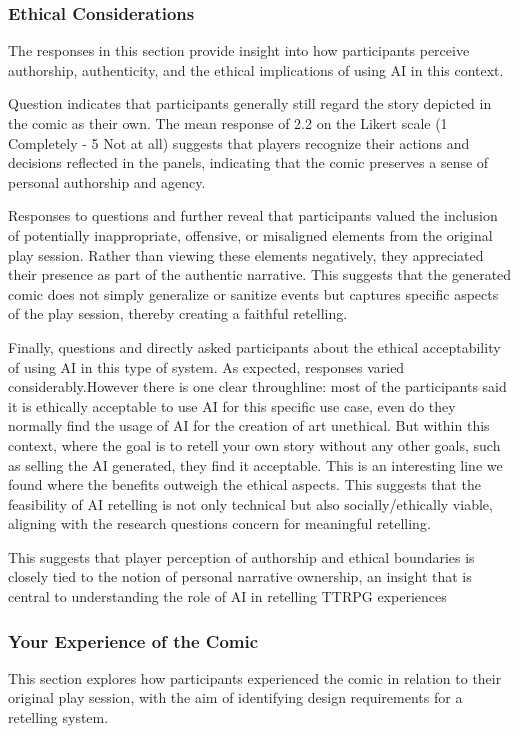 \subsubsection*{Ethical Considerations}
The responses in this section provide insight into how participants perceive authorship, authenticity, and the ethical implications of using AI in this context. 

Question  indicates that participants generally still regard the story depicted in the comic as their own. The mean response of 2.2 on the Likert scale (1 Completely - 5 Not at all) suggests that players recognize their actions and decisions reflected in the panels, indicating that the comic preserves a sense of personal authorship and agency.

Responses to questions  and  further reveal that participants valued the inclusion of potentially inappropriate, offensive, or misaligned elements from the original play session. Rather than viewing these elements negatively, they appreciated their presence as part of the authentic narrative. This suggests that the generated comic does not simply generalize or sanitize events but captures specific aspects of the play session, thereby creating a faithful retelling.

Finally, questions  and  directly asked participants about the ethical acceptability of using AI in this type of system. As expected, responses varied considerably.However there is one clear throughline: most of the participants said it is ethically acceptable to use AI for this specific use case, even do they normally find the usage of AI for the creation of art unethical. But within this context, where the goal is to retell your own story without any other goals, such as selling the AI generated, they find it acceptable. This is an interesting line we found where the benefits outweigh the ethical aspects. This suggests that the feasibility of AI retelling is not only technical but also socially/ethically viable, aligning with the research questions concern for meaningful retelling.

This suggests that player perception of authorship and ethical boundaries is closely tied to the notion of personal narrative ownership, an insight that is central to understanding the role of AI in retelling TTRPG experiences

\subsubsection*{Your Experience of the Comic}
This section explores how participants experienced the comic in relation to their original play session, with the aim of identifying design requirements for a retelling system.

